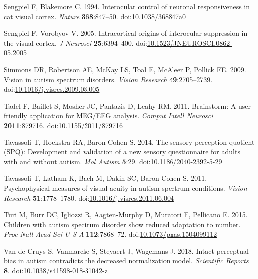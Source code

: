 \documentclass[
]{article}
\newlength{\cslhangindent}
\newlength{\cslentryspacingunit} %
\newenvironment{CSLReferences}[2] %
 {%
  \setlength{\parindent}{0pt}
  \ifodd #1
  \let\oldpar\par
  \def\par{\hangindent=\cslhangindent\oldpar}
  \fi
  \setlength{\parskip}{#2\cslentryspacingunit}
 }%
 {}
\begin{document}
\begin{CSLReferences}{1}{0}
\leavevmode{}%
Sengpiel F, Blakemore C. 1994. Interocular control of neuronal responsiveness in cat visual cortex. \emph{Nature} \textbf{368}:847--50. doi:\href{https://doi.org/10.1038/368847a0}{10.1038/368847a0}

\leavevmode{}%
Sengpiel F, Vorobyov V. 2005. Intracortical origins of interocular suppression in the visual cortex. \emph{J Neurosci} \textbf{25}:6394--400. doi:\href{https://doi.org/10.1523/JNEUROSCI.0862-05.2005}{10.1523/JNEUROSCI.0862-05.2005}

\leavevmode{}%
Simmons DR, Robertson AE, McKay LS, Toal E, McAleer P, Pollick FE. 2009. Vision in autism spectrum disorders. \emph{Vision Research} \textbf{49}:2705--2739. doi:\href{https://doi.org/10.1016/j.visres.2009.08.005}{10.1016/j.visres.2009.08.005}

\leavevmode{}%
Tadel F, Baillet S, Mosher JC, Pantazis D, Leahy RM. 2011. Brainstorm: A user-friendly application for MEG/EEG analysis. \emph{Comput Intell Neurosci} \textbf{2011}:879716. doi:\href{https://doi.org/10.1155/2011/879716}{10.1155/2011/879716}

\leavevmode{}%
Tavassoli T, Hoekstra RA, Baron-Cohen S. 2014. The sensory perception quotient (SPQ): Development and validation of a new sensory questionnaire for adults with and without autism. \emph{Mol Autism} \textbf{5}:29. doi:\href{https://doi.org/10.1186/2040-2392-5-29}{10.1186/2040-2392-5-29}

\leavevmode{}%
Tavassoli T, Latham K, Bach M, Dakin SC, Baron-Cohen S. 2011. Psychophysical measures of visual acuity in autism spectrum conditions. \emph{Vision Research} \textbf{51}:1778--1780. doi:\href{https://doi.org/10.1016/j.visres.2011.06.004}{10.1016/j.visres.2011.06.004}

\leavevmode{}%
Turi M, Burr DC, Igliozzi R, Aagten-Murphy D, Muratori F, Pellicano E. 2015. Children with autism spectrum disorder show reduced adaptation to number. \emph{Proc Natl Acad Sci U S A} \textbf{112}:7868--72. doi:\href{https://doi.org/10.1073/pnas.1504099112}{10.1073/pnas.1504099112}

\leavevmode{}%
Van de Cruys S, Vanmarcke S, Steyaert J, Wagemans J. 2018. Intact perceptual bias in autism contradicts the decreased normalization model. \emph{Scientific Reports} \textbf{8}. doi:\href{https://doi.org/10.1038/s41598-018-31042-z}{10.1038/s41598-018-31042-z}


\end{CSLReferences}
\end{document}
